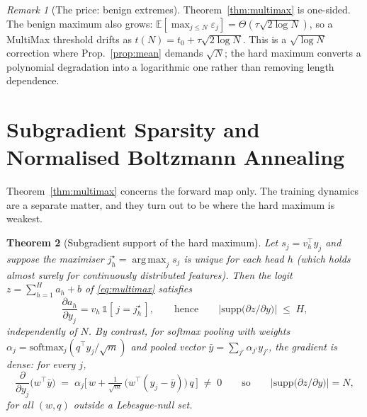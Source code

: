 \documentclass[10pt]{article}
\theoremstyle{plain}
\newtheorem{theorem}{Theorem}[section]
\theoremstyle{definition}
\theoremstyle{remark}
\newtheorem{remark}[theorem]{Remark}
\DeclareMathOperator*{\argmax}{arg\,max}
\newcommand{\E}{\mathbb{E}}
\begin{document}
\begin{remark}[The price: benign extremes]
\label{rem:fpr}
Theorem~\ref{thm:multimax} is one-sided. The benign maximum also grows:
$\E[\max_{j\le N}\varepsilon_j]=\Theta(\tau\sqrt{2\log N})$, so a MultiMax threshold
drifts as $t(N)=t_0+\tau\sqrt{2\log N}$. This is a $\sqrt{\log N}$ correction where
Prop.~\ref{prop:mean} demands $\sqrt N$; the hard maximum converts a polynomial
degradation into a logarithmic one rather than removing length dependence.
\end{remark}

\section{Subgradient Sparsity and Normalised Boltzmann Annealing}
\label{sec:annealing}
Theorem~\ref{thm:multimax} concerns the forward map only. The training dynamics are a
separate matter, and they turn out to be where the hard maximum is weakest.

\begin{theorem}[Subgradient support of the hard maximum]
\label{lem:sparsity}
Let $s_j=v_h^\top y_j$ and suppose the maximiser $j^\star_h=\argmax_j s_j$ is unique for
each head $h$ (which holds almost surely for continuously distributed features). Then the
logit $z=\sum_{h=1}^H a_h + b$ of \eqref{eq:multimax} satisfies
\begin{equation}
  \frac{\partial a_h}{\partial y_j}
  = v_h\,\mathbb{1}\!\left[\,j=j^\star_h\,\right],
  \qquad\text{hence}\qquad
  \big|\mathrm{supp}\big(\partial z/\partial y\big)\big| \;\le\; H,
  \label{eq:hardgrad}
\end{equation}
independently of $N$. By contrast, for softmax pooling with weights
$\alpha_j=\mathrm{softmax}_j(q^\top y_j/\sqrt m)$ and pooled vector
$\bar y=\sum_{j'}\alpha_{j'}y_{j'}$, the gradient is dense: for every $j$,
\begin{equation}
  \frac{\partial}{\partial y_j}\big(w^\top\bar y\big)
  \;=\;\alpha_j\Big[\,w+\tfrac{1}{\sqrt m}\,\big(w^\top(y_j-\bar y)\big)\,q\,\Big]
  \;\ne\;0
  \qquad\text{so}\qquad
  \big|\mathrm{supp}\big(\partial z/\partial y\big)\big| = N ,
  \label{eq:softgrad}
\end{equation}
for all $(w,q)$ outside a Lebesgue-null set.
\end{theorem}
\end{document}
